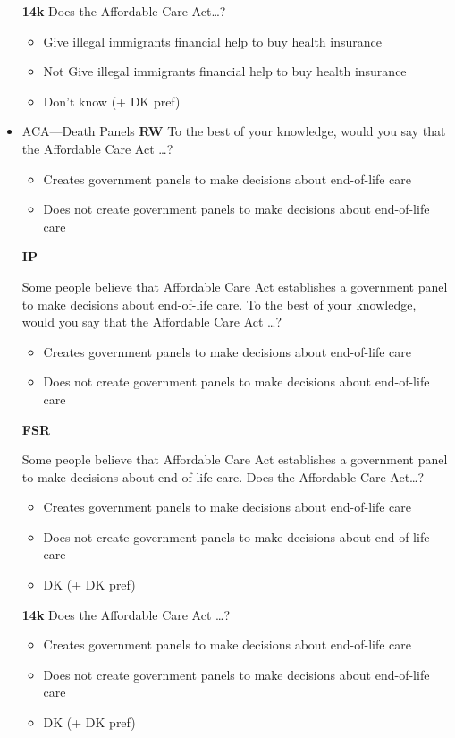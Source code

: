 \begin{itemize}
\textbf{14k}\newline
Does the Affordable Care Act\ldots?
\begin{itemize}
	\item Give illegal immigrants financial help to buy health insurance
	\item Not Give illegal immigrants financial help to buy health insurance
	\item Don't know (+ DK pref)
\end{itemize}

\item ACA—Death Panels\newline
\textbf{RW}\newline
To the best of your knowledge, would you say that the Affordable Care Act \ldots?
\begin{itemize}
	\item Creates government panels to make decisions about end-of-life care
	\item Does not create government panels to make decisions about end-of-life care
\end{itemize}

\textbf{IP}\newline

Some people believe that Affordable Care Act establishes a government panel to
make decisions about end-of-life care. To the best of your knowledge, would you say
that the Affordable Care Act \ldots?
\begin{itemize}
	\item Creates government panels to make decisions about end-of-life care
	\item Does not create government panels to make decisions about end-of-life care
\end{itemize}

\textbf{FSR}\newline

Some people believe that Affordable Care Act establishes a government panel to
make decisions about end-of-life care. Does the Affordable Care Act\ldots?
\begin{itemize}
	\item Creates government panels to make decisions about end-of-life care
	\item Does not create government panels to make decisions about end-of-life care
	\item DK (+ DK pref)
\end{itemize}

\textbf{14k}\newline
Does the Affordable Care Act \ldots?
\begin{itemize}
	\item Creates government panels to make decisions about end-of-life care
	\item Does not create government panels to make decisions about end-of-life care
	\item DK (+ DK pref)
\end{itemize}


\end{itemize}
